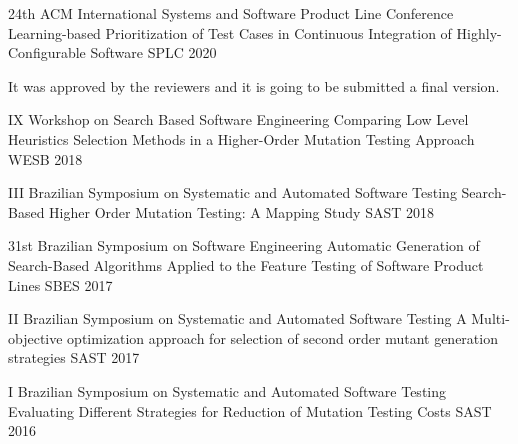 \begin{cventries}
	
	\cventry
	{24th ACM International Systems and Software Product Line Conference} %
	{Learning-based Prioritization of Test Cases in Continuous Integration of Highly-Configurable Software} %
	{SPLC} %
	{2020} %
	{
		\begin{cvitems} %
			\item {It was approved by the reviewers and it is going to be submitted a final version.}
		\end{cvitems}
	}

	\cventry
	{IX Workshop on Search Based Software Engineering} %
	{Comparing Low Level Heuristics Selection Methods in a Higher-Order Mutation Testing Approach} %
	{WESB} %
	{2018} %
	{}
	

	\cventry
	{III Brazilian Symposium on Systematic and Automated Software Testing} %
	{Search-Based Higher Order Mutation Testing: A Mapping Study} %
	{SAST} %
	{2018} %
	{}


	\cventry
	{31st Brazilian Symposium on Software Engineering} %
	{Automatic Generation of Search-Based Algorithms Applied to the Feature Testing of Software Product Lines} %
	{SBES} %
	{2017} %
	{}

	
	\cventry
	{II Brazilian Symposium on Systematic and Automated Software Testing} %
	{A Multi-objective optimization approach for selection of second order mutant generation strategies} %
	{SAST} %
	{2017} %
	{}
	
	\cventry
	{I Brazilian Symposium on Systematic and Automated Software Testing} %
	{Evaluating Different Strategies for Reduction of Mutation Testing Costs} %
	{SAST} %
	{2016} %
	{}
	
\end{cventries}
